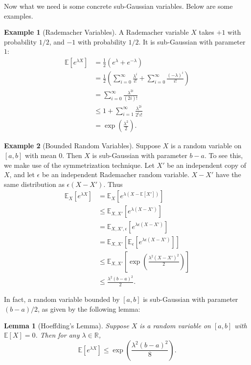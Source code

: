 \documentclass[openany]{book}
\newtheorem{lemma}{Lemma}[chapter]
\theoremstyle{definition}
\newtheorem{example}{Example}[chapter]
\theoremstyle{remark}
\begin{document}
Now what we need is some concrete sub-Gaussian variables. Below are some examples.
\begin{example}[Rademacher Variables]
    A Rademacher variable $X$ takes $+1$ with probability $1/2$, and $-1$ with probability $1/2$. It is sub-Gaussian with parameter $1$:
    \begin{align*}
            \mathbb{E}\left[e^{\lambda X}\right] & =\frac{1}{2}\left(e^{\lambda}+e^{-\lambda}\right) \\
             & =\frac{1}{2}\left(\sum_{i=0}^{\infty}\frac{\lambda^i}{i!}+\sum_{i=0}^{\infty}\frac{(-\lambda)^i}{i!}\right) \\
             & =\sum_{i=0}^{\infty}\frac{\lambda^{2i}}{(2i)!} \\
             & \le1+\sum_{i=1}^{\infty}\frac{\lambda^{2i}}{2^ii!} \\
             & =\exp\left(\frac{\lambda^2}{2}\right).
    \end{align*}
\end{example}
\begin{example}[Bounded Random Variables]
    Suppose $X$ is a random variable on $[a,b]$ with mean $0$. Then $X$ is sub-Gaussian with parameter $b-a$. To see this, we make use of the symmetrization technique. Let $X'$ be an independent copy of $X$, and let $\epsilon$ be an independent Rademacher random variable. $X-X'$ have the same distribution as $\epsilon(X-X')$. Thus
    \begin{align*}
        \mathbb{E}_{X}\left[e^{\lambda X}\right] & =\mathbb{E}_{X}\left[e^{\lambda\left(X-\mathbb{E}[X']\right)}\right] \\
             & \le \mathbb{E}_{X,X'}\left[e^{\lambda(X-X')}\right] \\
             & =\mathbb{E}_{X,X',\epsilon}\left[e^{\lambda\epsilon(X-X')}\right] \\
             & =\mathbb{E}_{X,X'}\left[\mathbb{E}_{\epsilon}\left[e^{\lambda\epsilon(X-X')}\right]\right] \\
             & \le \mathbb{E}_{X,X'}\left[\exp\left(\frac{\lambda^2(X-X')^2}{2}\right)\right] \\
             & \le \frac{\lambda^2(b-a)^2}{2}.
    \end{align*}
\end{example}
In fact, a random variable bounded by $[a,b]$ is sub-Gaussian with parameter $(b-a)/2$, as given by the following lemma:
\begin{lemma}[Hoeffding's Lemma]\label{HoeffdingLem}
    Suppose $X$ is a random variable on $[a,b]$ with $\mathbb{E}[X]=0$. Then for any $\lambda\in \mathbb{R}$,
    \begin{equation*}
        \mathbb{E}\left[e^{\lambda X}\right]\le\exp\left(\frac{\lambda^2(b-a)^2}{8}\right).
    \end{equation*}
\end{lemma}
\end{document}
